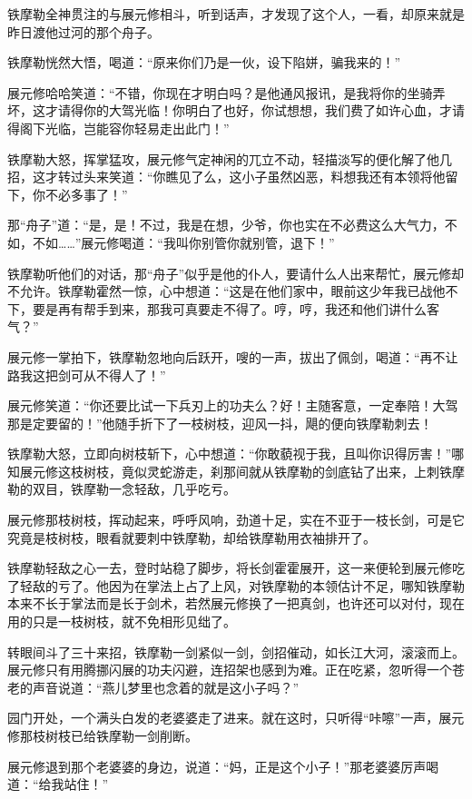 \documentclass[12pt,oneside]{book}
\begin{document}
铁摩勒全神贯注的与展元修相斗，听到话声，才发现了这个人，一看，却原来就是昨日渡他过河的那个舟子。

铁摩勒恍然大悟，喝道：``原来你们乃是一伙，设下陷姘，骗我来的！''

展元修哈哈笑道：``不错，你现在才明白吗？是他通风报讯，是我将你的坐骑弄坏，这才请得你的大驾光临！你明白了也好，你试想想，我们费了如许心血，才请得阁下光临，岂能容你轻易走出此门！''

铁摩勒大怒，挥掌猛攻，展元修气定神闲的兀立不动，轻描淡写的便化解了他几招，这才转过头来笑道：``你瞧见了么，这小子虽然凶恶，料想我还有本领将他留下，你不必多事了！''

那``舟子''道：``是，是！不过，我是在想，少爷，你也实在不必费这么大气力，不如，不如\ldots\ldots{}''展元修喝道：``我叫你别管你就别管，退下！''

铁摩勒听他们的对话，那``舟子''似乎是他的仆人，要请什么人出来帮忙，展元修却不允许。铁摩勒霍然一惊，心中想道：``这是在他们家中，眼前这少年我已战他不下，要是再有帮手到来，那我可真要走不得了。哼，哼，我还和他们讲什么客气？''

展元修一掌拍下，铁摩勒忽地向后跃开，嗖的一声，拔出了佩剑，喝道：``再不让路我这把剑可从不得人了！''

展元修笑道：``你还要比试一下兵刃上的功夫么？好！主随客意，一定奉陪！大驾那是定要留的！''他随手折下了一枝树枝，迎风一抖，飓的便向铁摩勒刺去！

铁摩勒大怒，立即向树枝斩下，心中想道：``你敢藐视于我，且叫你识得厉害！''哪知展元修这枝树枝，竟似灵蛇游走，刹那间就从铁摩勒的剑底钻了出来，上刺铁摩勒的双目，铁摩勒一念轻敌，几乎吃亏。

展元修那枝树枝，挥动起来，呼呼风响，劲道十足，实在不亚于一枝长剑，可是它究竟是枝树枝，眼看就要刺中铁摩勒，却给铁摩勒用衣袖排开了。

铁摩勒轻敌之心一去，登时站稳了脚步，将长剑霍霍展开，这一来便轮到展元修吃了轻敌的亏了。他因为在掌法上占了上风，对铁摩勒的本领估计不足，哪知铁摩勒本来不长于掌法而是长于剑术，若然展元修换了一把真剑，也许还可以对付，现在用的只是一枝树枝，就不免相形见绌了。

转眼间斗了三十来招，铁摩勒一剑紧似一剑，剑招催动，如长江大河，滚滚而上。展元修只有用腾挪闪展的功夫闪避，连招架也感到为难。正在吃紧，忽听得一个苍老的声音说道：``燕儿梦里也念着的就是这小子吗？''

园门开处，一个满头白发的老婆婆走了进来。就在这时，只听得``咔嚓''一声，展元修那枝树枝已给铁摩勒一剑削断。

展元修退到那个老婆婆的身边，说道：``妈，正是这个小子！''那老婆婆厉声喝道：``给我站住！''
\end{document}
